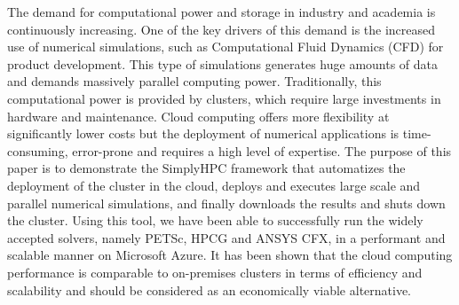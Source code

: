 The demand for computational power and storage in industry and academia is continuously increasing. One of the key drivers of this demand is the increased use of numerical simulations, such as Computational Fluid Dynamics (CFD) for product development. This type of simulations generates huge amounts of data and demands massively parallel computing power. Traditionally, this computational power is provided by clusters, which require large investments in hardware and maintenance. Cloud computing offers more flexibility at significantly lower costs but the deployment of numerical applications is time-consuming, error-prone and requires a high level of expertise. The purpose of this paper is to demonstrate the SimplyHPC framework that automatizes the deployment of the cluster in the cloud, deploys and executes large scale and parallel numerical simulations, and finally downloads the results and shuts down the cluster. Using this tool, we have been able to successfully run the widely accepted solvers, namely PETSc, HPCG and ANSYS CFX, in a performant and scalable manner on Microsoft Azure. It has been shown that the cloud computing performance is comparable to on-premises clusters in terms of efficiency and scalability and should be considered as an economically viable alternative. 